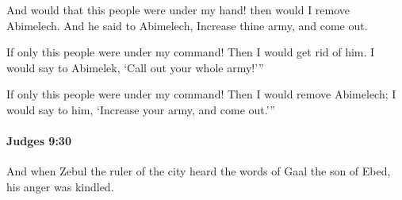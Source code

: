 			\begin{versebox}
					\item[BHS] 
					\item[ASV] And would that this people were under my hand! then would I remove Abimelech. And he said to Abimelech, Increase thine army, and come out.
					\item[NIV] If only this people were under my command! Then I would get rid of him. I would say to Abimelek, ‘Call out your whole army!’”
					\item[NRSV] If only this people were under my command! Then I would remove Abimelech; I would say to him, ‘Increase your army, and come out.’”
			\end{versebox}

		\paragraph{Judges 9:30} %
			\label{JUDGES-9-30}

			And when Zebul the ruler of the city heard the words of Gaal the son of Ebed, his anger was kindled.

